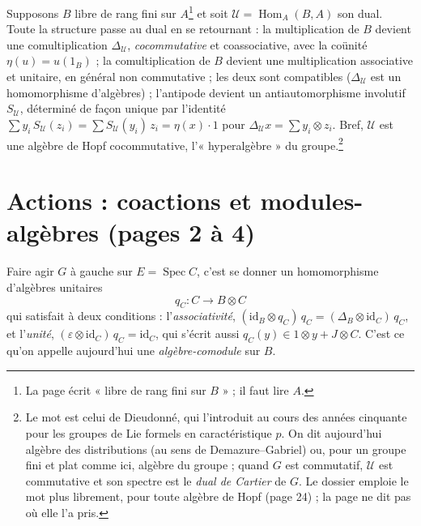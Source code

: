 \documentclass[11pt,a4paper]{article}
\begin{document}
Supposons $B$ libre de rang fini sur $A$\footnote{La page écrit « libre de
rang fini sur $B$ » ; il faut lire $A$.} et soit
$\mathcal{U} = \operatorname{Hom}_A(B, A)$ son dual. Toute la structure passe
au dual en se retournant : la multiplication de $B$ devient une
comultiplication $\Delta_{\mathcal{U}}$, \emph{cocommutative} et
coassociative, avec la coünité $\eta(u) = u(1_B)$ ; la comultiplication de
$B$ devient une multiplication associative et unitaire, en général non
commutative ; les deux sont compatibles ($\Delta_{\mathcal{U}}$ est un
homomorphisme d'algèbres) ; l'antipode devient un antiautomorphisme
involutif $S_{\mathcal{U}}$, déterminé de façon unique par l'identité
$\sum y_i\, S_{\mathcal{U}}(z_i) = \sum S_{\mathcal{U}}(y_i)\, z_i =
\eta(x)\cdot 1$ pour $\Delta_{\mathcal{U}} x = \sum y_i \otimes z_i$. Bref,
$\mathcal{U}$ est une algèbre de Hopf cocommutative, l'« hyperalgèbre » du
groupe.\footnote{Le mot est celui de Dieudonné, qui l'introduit au cours des
années cinquante pour les groupes de Lie formels en caractéristique $p$. On
dit aujourd'hui algèbre des distributions (au sens de Demazure--Gabriel) ou,
pour un groupe fini et plat comme ici, algèbre du groupe ; quand $G$ est
commutatif, $\mathcal{U}$ est commutative et son spectre est le \emph{dual de
Cartier} de $G$. Le dossier emploie le mot plus librement, pour toute algèbre
de Hopf (page 24) ; la page ne dit pas où elle l'a pris.}

\section*{Actions : coactions et modules-algèbres (pages 2 à 4)}

Faire agir $G$ à gauche sur $E = \operatorname{Spec} C$, c'est se donner un
homomorphisme d'algèbres unitaires
\[
q_C \colon C \longrightarrow B \otimes C
\]
qui satisfait à deux conditions : l'\emph{associativité},
$(\mathrm{id}_B \otimes q_C)\, q_C = (\Delta_B \otimes \mathrm{id}_C)\,
q_C$, et l'\emph{unité}, $(\varepsilon \otimes \mathrm{id}_C)\, q_C =
\mathrm{id}_C$, qui s'écrit aussi $q_C(y) \in 1 \otimes y + J \otimes C$.
C'est ce qu'on appelle aujourd'hui une \emph{algèbre-comodule} sur $B$.

\end{document}
